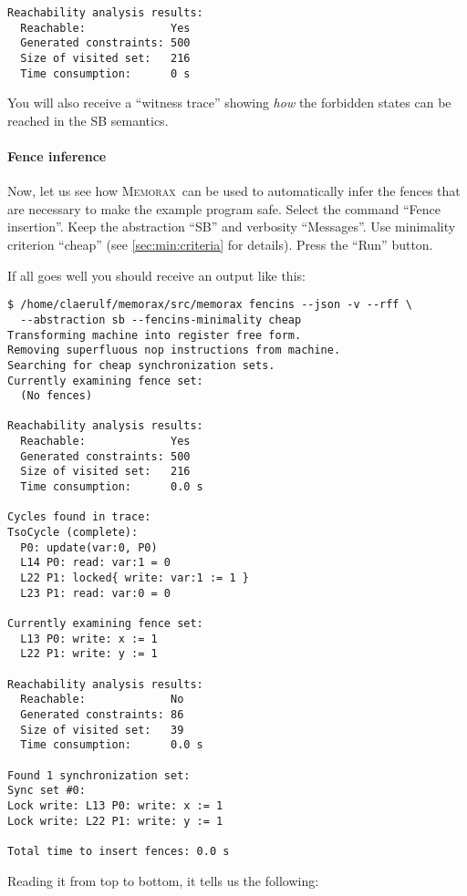 \documentclass[a4paper]{article}
\newcommand{\memorax}{\textsc{Memorax}}
\begin{document}
\noindent
\begin{verbatim}
Reachability analysis results:
  Reachable:             Yes
  Generated constraints: 500
  Size of visited set:   216
  Time consumption:      0 s
\end{verbatim}

You will also receive a ``witness trace'' showing \emph{how} the
forbidden states can be reached in the SB semantics.

\paragraph{Fence inference}
Now, let us see how \memorax\ can be used to automatically infer the
fences that are necessary to make the example program safe. Select the
command ``Fence insertion''. Keep the abstraction ``SB'' and verbosity
``Messages''. Use minimality criterion ``cheap'' (see
\cref{sec:min:criteria} for details). Press the ``Run'' button.

If all goes well you should receive an output like this:

\noindent
\begin{verbatim}
$ /home/claerulf/memorax/src/memorax fencins --json -v --rff \
  --abstraction sb --fencins-minimality cheap
Transforming machine into register free form.
Removing superfluous nop instructions from machine.
Searching for cheap synchronization sets.
Currently examining fence set:
  (No fences)

Reachability analysis results:
  Reachable:             Yes
  Generated constraints: 500
  Size of visited set:   216
  Time consumption:      0.0 s

Cycles found in trace:
TsoCycle (complete):
  P0: update(var:0, P0)
  L14 P0: read: var:1 = 0
  L22 P1: locked{ write: var:1 := 1 }
  L23 P1: read: var:0 = 0

Currently examining fence set:
  L13 P0: write: x := 1
  L22 P1: write: y := 1

Reachability analysis results:
  Reachable:             No
  Generated constraints: 86
  Size of visited set:   39
  Time consumption:      0.0 s

Found 1 synchronization set:
Sync set #0:
Lock write: L13 P0: write: x := 1
Lock write: L22 P1: write: y := 1

Total time to insert fences: 0.0 s
\end{verbatim}

Reading it from top to bottom, it tells us the following:
\end{document}
